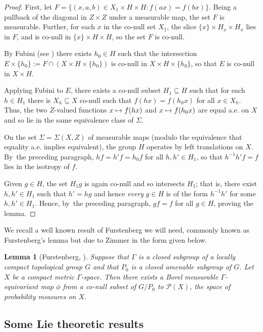 \documentclass[JEP,XML,SOM,Unicode,published]{cedram}
\def\mto{\mathchoice{\longmapsto}{\mapsto}{\mapsto}{\mapsto}}
\newtheorem{lemma}{Lemma}
\theoremstyle{definition}
\begin{document}
\begin{proof} First, let $F=\{(x,a,b)\in X_1\times H \times H: f(ax)=f(bx) \}$. Being a pullback of the diagonal in $Z\times Z$ under a measurable map, the set $F$ is measurable. Further, for each $x$ in the co-null set $X_1$, the slice $\{x\}\times H_x \times H_x$ lies in $F$, and is co-null in $\{x\}\times H\times H$, so the set $F$ is co-null.

By Fubini (see \cite[Th.\,A, p.\,147]{Hal}) there exists $h_0\in H$ such that the intersection $E\times\{h_0\}:=F\cap (X\times H\times\{h_0\})$ is co-null in $X\times H\times\{h_0\}$, so that $E$ is co-null in $X\times H$.

Applying Fubini to $E$, there exists a co-null subset $H_1\subseteq H$ such that for each $h\in H_1$ there is $X_h\subseteq X$ co-null such that $f(hx)=f(h_0x)$ for all $x\in X_h$. Thus, the two $Z$-valued functions $x\mto f(hx)$ and $x\mto f(h_0x)$ are equal a.e. on $X$ and so lie in the same equivalence class of $\Sigma$.

On the set $\Sigma =\Sigma (X,Z)$ of measurable maps (modulo the equivalence that equality a.e. implies equivalent), the group $H$ operates by left translations on $X$. By~the preceding paragraph, $h f =h'f=h_0f$ for all $h,h' \in H_1$, so that $h^{-1}h'f=f$ lies in the isotropy of $f$.

Given $g\in H$, the set $H_1g$ is again co-null and so intersects $H_1$; that is, there exist $h,h'\in H_1$ such that $h'=hg$ and hence \emph{every} $g\in H$ is of the form $h^{-1}h'$ for some $h,h'\in H_1$. Hence, by~the preceding paragraph, $gf=f$ for all $g\in H$, proving the lemma.
\end{proof}

We recall a well known result of Furstenberg we will need, commonly known as Furstenberg's lemma but due to Zimmer in the form given below.

\begin{lemma}[{Furstenberg, \cite[Cor.\,(4.3.7) \& Prop.\,(4.3.9)]{Z}}]\label{furstenberg}
Suppose that $\Gamma $ is a closed subgroup of a locally compact topological group $G$ and that $P_0$ is
a closed amenable subgroup of $G$. Let $X$ be a compact metric $\Gamma $-space. Then there exists a Borel measurable $\Gamma $-equivariant map $\phi$ from a co-null subset of $G/P_0$ to $\mathcal{P}(X)$, the space of probability
measures on $X$.
\end{lemma}

\subsection{Some Lie theoretic results}
\end{document}
